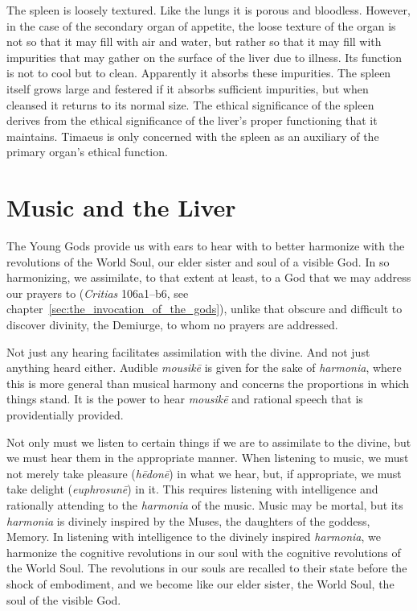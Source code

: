 The spleen is loosely textured. Like the lungs it is porous and bloodless. However, in the case of the secondary organ of appetite, the loose texture of the organ is not so that it may fill with air and water, but rather so that it may fill with impurities that may gather on the surface of the liver due to illness. Its function is not to cool but to clean. Apparently it absorbs these impurities. The spleen itself grows large and festered if it absorbs sufficient impurities, but when cleansed it returns to its normal size. The ethical significance of the spleen derives from the ethical significance of the liver's proper functioning that it maintains. Timaeus is only concerned with the spleen as an auxiliary of the primary organ's ethical function.


\section{Music and the Liver} %
\label{sec:audition_and_the_liver}

The Young Gods provide us with ears to hear with to better harmonize with the revolutions of the World Soul, our elder sister and soul of a visible God. In so harmonizing, we assimilate, to that extent at least, to a God that we may address our prayers to (\emph{Critias} 106a1–b6, see chapter~\ref{sec:the_invocation_of_the_gods}), unlike that obscure and difficult to discover divinity, the Demiurge, to whom no prayers are addressed.

Not just any hearing facilitates assimilation with the divine. And not just anything heard either. Audible \emph{mousikē} is given for the sake of \emph{harmonia}, where this is more general than musical harmony and concerns the proportions in which things stand. It is the power to hear \emph{mousikē} and rational speech that is providentially provided.

Not only must we listen to certain things if we are to assimilate to the divine, but we must hear them in the appropriate manner. When listening to music, we must not merely take pleasure (\emph{hēdonē}) in what we hear, but, if appropriate, we must take delight (\emph{euphrosunē}) in it. This requires listening with intelligence and rationally attending to the \emph{harmonia} of the music. Music may be mortal, but its \emph{harmonia} is divinely inspired by the Muses, the daughters of the goddess, Memory. In listening with intelligence to the divinely inspired \emph{harmonia}, we harmonize the cognitive revolutions in our soul with the cognitive revolutions of the World Soul. The revolutions in our souls are recalled to their state before the shock of embodiment, and we become like our elder sister, the World Soul, the soul of the visible God. 

